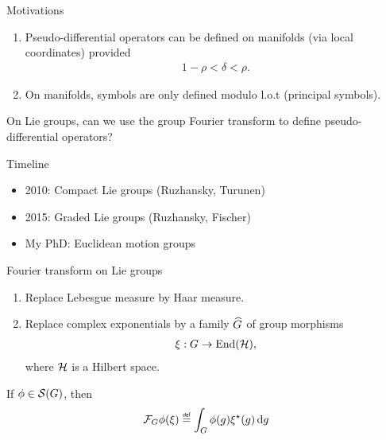 \documentclass[handout]{beamer}
\begin{document}
\begin{frame}
    {Motivations}

    \pause
    \begin{enumerate}
        \item
            Pseudo-differential operators can be defined on manifolds (via local coordinates)
            provided
            \begin{align*}
                1 - \rho < \delta < \rho.
            \end{align*}
            \pause
        \item
            On manifolds, symbols are only defined modulo l.o.t (principal symbols).
    \end{enumerate}

    On Lie groups,
    can we use the group Fourier transform to define pseudo-differential operators?
\end{frame}

\begin{frame}
    {Timeline}

    \begin{itemize}
        \pause
        \item 2010: Compact Lie groups (Ruzhansky, Turunen)
        \pause
        \item 2015: Graded Lie groups (Ruzhansky, Fischer)
        \pause
        \item My PhD: Euclidean motion groups
    \end{itemize}
\end{frame}

\begin{frame}
    {Fourier transform on Lie groups}

    \begin{enumerate}
        \item Replace Lebesgue measure by Haar measure.
            \pause
        \item Replace complex exponentials by a family ${\widehat{G}}$ of group morphisms
            \begin{align*}
                \xi : G \to \operatorname{End}(\mathcal{H}),
            \end{align*}
            where $\mathcal{H}$ is a Hilbert space.
    \end{enumerate}
    \pause
    If $\phi \in {\mathcal{S} (G)}$,
    then
    \begin{align*}
        \Fourier \phi(\xi) \defeq \int_\Group \phi(g) \adj \xi(g) \dd g
    \end{align*}
\end{frame}
\end{document}
